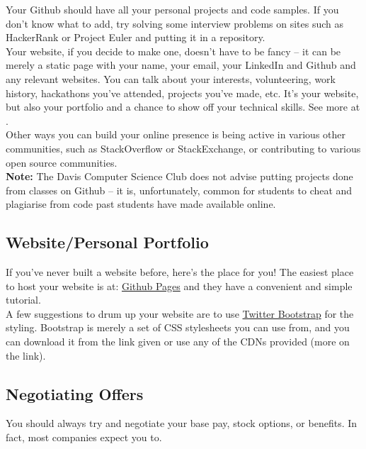 \documentclass{article}
\begin{document}
Your Github should have all your personal projects and code samples. If you don't know what to add, try solving some interview problems on sites such as HackerRank or Project Euler and putting it in a repository. \\ 

Your website, if you decide to make one, doesn't have to be fancy -- it can be merely a static page with your name, your email, your LinkedIn and Github and any relevant websites. You can talk about your interests, volunteering, work history, hackathons you've attended, projects you've made, etc. It's your website, but also your portfolio and a chance to show off your technical skills. See more at . \\

Other ways you can build your online presence is being active in various other communities, such as StackOverflow or StackExchange, or contributing to various open source communities.\\

\textbf{Note:} The Davis Computer Science Club does not advise putting projects done from classes on Github -- it is, unfortunately, common for students to cheat and plagiarise from code past students have made available online.
\subsection {Website/Personal Portfolio}
\label{sec:website}
\hspace{0.5cm} If you've never built a website before, here's the place for you! The easiest place to host your website is at: \href{https://pages.github.com/}{Github Pages} and they have a convenient and simple tutorial. \\

A few suggestions to drum up your website are to use \href{http://getbootstrap.com/2.3.2/}{Twitter Bootstrap} for the styling. Bootstrap is merely a set of CSS stylesheets you can use from, and you can download it from the link given or use any of the CDNs provided (more on the link).
\subsection {Negotiating Offers}
\hspace{0.5cm} You should always try and negotiate your base pay, stock options, or benefits. In fact, most companies expect you to. \\
\end{document}

